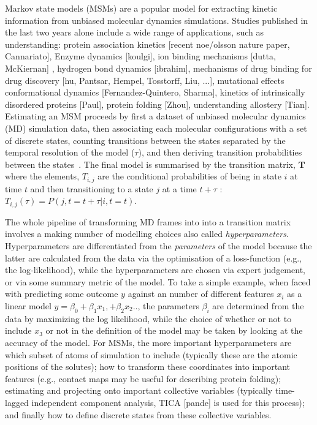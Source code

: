 \documentclass[journal=jacsat,manuscript=article]{achemso}
\begin{document}
Markov state models (MSMs) are a popular model for extracting kinetic information from unbiased molecular dynamics simulations. Studies published in the last two years alone include a wide range of applications, such as understanding:  protein association kinetics [recent noe/olsson nature paper, Cannariato], Enzyme dynamics [koulgi], ion binding mechanisms  [dutta, McKiernan] , hydrogen bond dynamics [ibrahim], mechanisms of drug binding for drug discovery [hu, Pantsar, Hempel, Tosstorff, Liu, ...], mutational effects conformational dynamics [Fernandez-Quintero, Sharma], kinetics of intrinsically disordered proteins [Paul], protein folding [Zhou], understanding allostery [Tian].  Estimating an MSM proceeds by first a dataset of unbiased molecular dynamics (MD) simulation data, then associating each molecular configurations with a set of discrete states, counting transitions between the states separated by the temporal resolution of the model ($\tau$), and then deriving transition probabilities between the states~\cite{trendelkamp-schroer_estimation_2015}. The final model is summarised by the transition matrix, $\mathbf{T}$ where the elements, $T_{i, j}$ are the conditional probabilities of being in state $i$ at time $t$ and then transitioning to a state $j$ at a time $t+\tau$ : $T_{i,j}(\tau) = P(j, t=t+\tau| i, t=t)$.  

The whole pipeline of transforming MD frames into into a transition matrix involves a making number of modelling choices also called \emph{hyperparameters}. Hyperparameters are differentiated from the \emph{parameters} of the model because the latter are calculated from the data via the optimisation of a loss-function (e.g., the log-likelihood), while the hyperparameters are chosen via expert judgement, or via some summary metric of the model. To take a simple example, when faced with predicting some outcome $y$ against an number of different features $x_i$ as a linear model $y = \beta_0  + \beta_1 x_1, + \beta_2 x_2 ..$, the parameters $\beta_i$ are determined from the data by maximizing the log likelihood, while the choice of whether or not to include $x_3$ or not in the definition of the model may be taken by looking at the accuracy of the model.  For MSMs, the more important hyperparameters are which subset of atoms of simulation to include (typically these are the atomic positions of the solutes); how to transform these coordinates into important  features (e.g., contact maps may be useful for describing protein folding); estimating and projecting onto important collective variables (typically time-lagged independent component analysis, TICA [pande] is used for this process); and finally how to define discrete states from these collective variables.  
\end{document}
